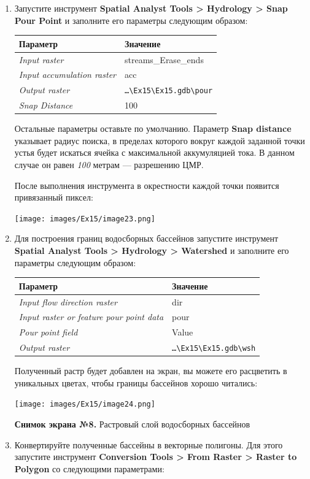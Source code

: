 \documentclass[12pt,]{book}
\begin{document}
\begin{enumerate}
\def\labelenumi{\arabic{enumi}.}
\item
  Запустите инструмент \textbf{Spatial Analyst Tools \textgreater{} Hydrology \textgreater{} Snap Pour Point} и заполните его параметры следующим образом:

  \begin{longtable}[]{@{}ll@{}}
  \toprule
  Параметр & Значение\tabularnewline
  \midrule
  \endhead
  \emph{Input raster} & streams\_Erase\_ends\tabularnewline
  \emph{Input accumulation raster} & acc\tabularnewline
  \emph{Output raster} & \texttt{\ldots{}\textbackslash{}Ex15\textbackslash{}Ex15.gdb\textbackslash{}pour}\tabularnewline
  \emph{Snap Distance} & 100\tabularnewline
  \bottomrule
  \end{longtable}

  Остальные параметры оставьте по умолчанию. Параметр \textbf{Snap distance} указывает радиус поиска, в пределах которого вокруг каждой заданной точки устья будет искаться ячейка с максимальной аккумуляцией тока. В данном случае он равен \emph{100} метрам --- разрешению ЦМР.

  После выполнения инструмента в окрестности каждой точки появится привязанный пиксел:

  \texttt{[image: images/Ex15/image23.png]}
\item
  Для построения границ водосборных бассейнов запустите инструмент \textbf{Spatial Analyst Tools \textgreater{} Hydrology \textgreater{} Watershed} и заполните его параметры следующим образом:

  \begin{longtable}[]{@{}ll@{}}
  \toprule
  Параметр & Значение\tabularnewline
  \midrule
  \endhead
  \emph{Input flow direction raster} & dir\tabularnewline
  \emph{Input raster or feature pour point data} & pour\tabularnewline
  \emph{Pour point field} & Value\tabularnewline
  \emph{Output raster} & \texttt{\ldots{}\textbackslash{}Ex15\textbackslash{}Ex15.gdb\textbackslash{}wsh}\tabularnewline
  \bottomrule
  \end{longtable}

  Полученный растр будет добавлен на экран, вы можете его расцветить в уникальных цветах, чтобы границы бассейнов хорошо читались:

  \texttt{[image: images/Ex15/image24.png]}

  \textbf{Снимок экрана №8.} Растровый слой водосборных бассейнов
\item
  Конвертируйте полученные бассейны в векторные полигоны. Для этого запустите инструмент \textbf{Conversion Tools \textgreater{} From Raster \textgreater{} Raster to Polygon} со следующими параметрами:


\end{enumerate}
\end{document}
